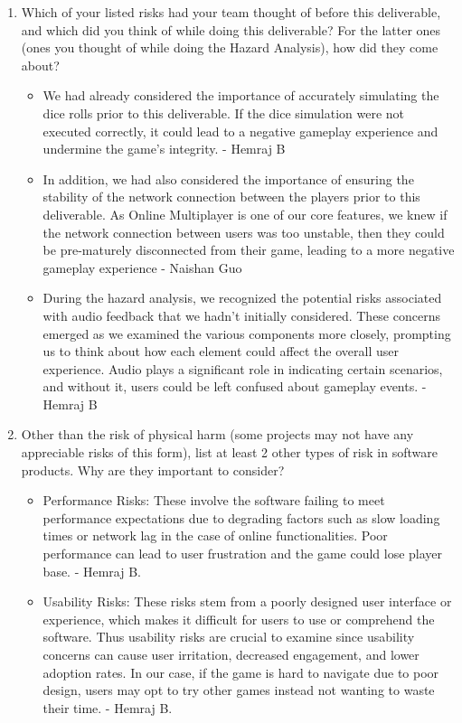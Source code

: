 \documentclass{article}
\begin{document}
\begin{enumerate}
    \item Which of your listed risks had your team thought of before this
    deliverable, and which did you think of while doing this deliverable? For
    the latter ones (ones you thought of while doing the Hazard Analysis), how
    did they come about?
    
    \begin{itemize}
        \item We had already considered the importance of accurately simulating the dice rolls prior to this deliverable. If the dice simulation were not executed correctly, it could lead to a negative gameplay experience and undermine the game's integrity. - Hemraj B
         \item In addition, we had also considered the importance of ensuring the stability of the network connection between the players prior to this deliverable. As Online Multiplayer is one of our core features, we knew if the network connection between users was too unstable, then they could be pre-maturely disconnected from their game, leading to a more negative gameplay experience - Naishan Guo
        \item During the hazard analysis, we recognized the potential risks associated with audio feedback that we hadn't initially considered. These concerns emerged as we examined the various components more closely, prompting us to think about how each element could affect the overall user experience. Audio plays a significant role in indicating certain scenarios, and without it, users could be left confused about gameplay events. - Hemraj B
    \end{itemize}
    
    \item Other than the risk of physical harm (some projects may not have any
    appreciable risks of this form), list at least 2 other types of risk in
    software products. Why are they important to consider?

    \begin{itemize}
        \item Performance Risks: These involve the software failing to meet performance expectations due to degrading factors such as slow loading times or network lag in the case of online functionalities. Poor performance can lead to user frustration and the game could lose player base. - Hemraj B.
        \item Usability Risks: These risks stem from a poorly designed user interface or experience, which makes it difficult for users to use or comprehend the software. Thus usability risks are crucial to examine since usability concerns can cause user irritation, decreased engagement, and lower adoption rates. In our case, if the game is hard to navigate due to poor design, users may opt to try other games instead not wanting to waste their time. - Hemraj B.
	\end{itemize}



\end{enumerate}
\end{document}
